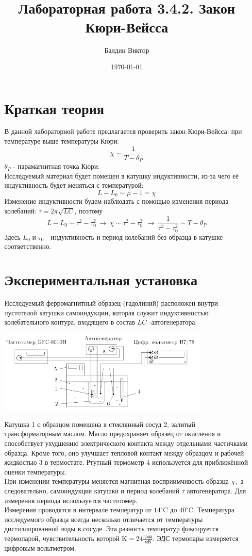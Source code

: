 \documentclass[a4paper, 12pt]{article}
\title{Лабораторная работа 3.4.2. Закон Кюри-Вейсса}
\author{Балдин Виктор}
\date{\today}
\begin{document}
	\maketitle

	\section*{Краткая теория}
	В данной лабораторной работе предлагается проверить закон Кюри-Вейсса: при температуре выше температуры Кюри:
	\[\chi \sim \frac{1}{T - \theta_P}\]
	$\theta_P$ - парамагнитная точка Кюри.\\
	Исследуемый материал будет помещен в катушку индуктивности, из-за чего её индуктивность будет меняться с температурой:
	\[L - L_0 \sim \mu - 1 = \chi\]
	Изменение индуктивности будем наблюдать с помощью изменения периода колебаний: $\tau = 2\pi\sqrt{LC}$, поэтому
	\[L - L_0 \sim \tau^2 - \tau_0^2 \ \rightarrow \ \chi \sim \tau^2 - \tau_0^2 \ \ \rightarrow \ \frac{1}{\tau^2 - \tau_0^2} \sim T - \theta_P\]
	Здесь $L_0$ и $\tau_0$ - индуктивность и период колебаний без образца в катушке соответственно.
	\section*{Экспериментальная установка}

	Исследуемый ферромагнитный образец (гадолиний) расположен внутри пустотелой катушки самоиндукции, которая служит индуктивностью колебательного контура, входящего в состав $L C$ -автогенератора.

	\begin{center}
		\includegraphics[width=0.8\textwidth]{1.png}
		\label{pic1}
	\end{center}
	Катушка 1 с образцом помещена в стеклянный сосуд 2, залитый трансформаторным маслом. Масло предохраняет образец от окисления и способствует ухудшению электрического контакта между отдельными частичками образца. Кроме того, оно улучшает тепловой контакт между образцом и рабочей жидкостью 3 в термостате. Ртутный термометр 4 используется для приближённой оценки температуры.\\
	При изменении температуры меняется магнитная восприимчивость образца $\chi,$ а следовательно, самоиндукция катушки и период колебаний $\tau$ автогенератора. Для измерения периода используется частотомер. \\
	Измерения проводятся в интервале температур от $14^{\circ} \mathrm{C}$ до $40^{\circ} \mathrm{C} .$
	Температура исследуемого образца всегда несколько отличается от температуры дистиллированной воды в сосуде. Эта разность температур фиксируется термопарой, чувствительность которой $\mathrm{K}=24\frac{\text{град}}{\text{мВ}}$. ЭДС термопары измеряется цифровым вольтметром.
\end{document}
